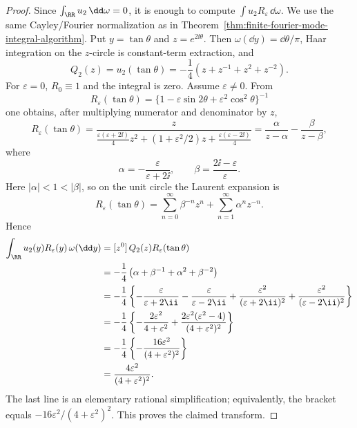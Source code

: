 \ifdefined\JFAArticleMain
{}
\else
\begin{proof}
Since \(\int_{\RR}u_2\,\dd\omega=0\), it is enough to compute
\(\int u_2R_\varepsilon\,\dd\omega\).  We use the same Cayley/Fourier
normalization as in Theorem~\ref{thm:finite-fourier-mode-integral-algorithm}.
Put \(y=\tan\theta\) and \(z=e^{2\ii\theta}\).  Then
\(\omega(\dd y)=\dd\theta/\pi\), Haar integration on the \(z\)-circle is
constant-term extraction, and
\[
  Q_2(z)=u_2(\tan\theta)
  =-\frac14(z+z^{-1}+z^2+z^{-2}).
\]
For \(\varepsilon=0\), \(R_0\equiv1\) and the integral is zero.  Assume
\(\varepsilon\ne0\).  From
\[
R_\varepsilon(\tan\theta)
=\{1-\varepsilon\sin2\theta+\varepsilon^2\cos^2\theta\}^{-1}
\]
one obtains, after multiplying numerator and denominator by \(z\),
\[
R_\varepsilon(\tan\theta)
=
\frac{z}
{\frac{\varepsilon(\varepsilon+2\ii)}4z^2
+(1+\varepsilon^2/2)z
+\frac{\varepsilon(\varepsilon-2\ii)}4}
=
\frac{\alpha}{z-\alpha}-\frac{\beta}{z-\beta},
\]
where
\[
\alpha=-\frac{\varepsilon}{\varepsilon+2\ii},
\qquad
\beta=\frac{2\ii-\varepsilon}{\varepsilon}.
\]
Here \(|\alpha|<1<|\beta|\), so on the unit circle the Laurent expansion is
\[
R_\varepsilon(\tan\theta)
=\sum_{n=0}^{\infty}\beta^{-n}z^n
+\sum_{n=1}^{\infty}\alpha^nz^{-n}.
\]
Hence
\[
\begin{aligned}
\int_{\RR}u_2(y)R_\varepsilon(y)\,\omega(\dd y)
&=[z^0]\,Q_2(z)R_\varepsilon(\tan\theta)\\
&=-\frac14\left(\alpha+\beta^{-1}+\alpha^2+\beta^{-2}\right)\\
&=-\frac14\left\{
-\frac{\varepsilon}{\varepsilon+2\ii}
-\frac{\varepsilon}{\varepsilon-2\ii}
+\frac{\varepsilon^2}{(\varepsilon+2\ii)^2}
+\frac{\varepsilon^2}{(\varepsilon-2\ii)^2}
\right\}  \\
&=-\frac14\left\{
-\frac{2\varepsilon^2}{4+\varepsilon^2}
+\frac{2\varepsilon^2(\varepsilon^2-4)}
{(4+\varepsilon^2)^2}
\right\}  \\
&=-\frac14\left\{
-\frac{16\varepsilon^2}{(4+\varepsilon^2)^2}
\right\}  \\
&=\frac{4\varepsilon^2}{(4+\varepsilon^2)^2}.
\end{aligned}
\]
The last line is an elementary rational simplification; equivalently, the
bracket equals \(-16\varepsilon^2/(4+\varepsilon^2)^2\).  This proves the
claimed transform.
\end{proof}
\fi

